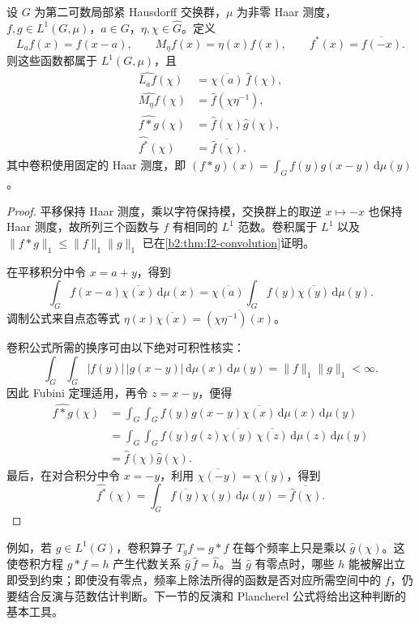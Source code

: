 \begin{proposition}[平移、调制、卷积与对合]
\label{b2:prop:I3-fourier-calculus}
设 \(G\) 为第二可数局部紧 Hausdorff 交换群，\(\mu\) 为非零 Haar 测度，\(f,g\in L^1(G,\mu)\)，\(a\in G\)，\(\eta,\chi\in\widehat G\)。定义
\[
 L_af(x)=f(x-a),\qquad M_\eta f(x)=\eta(x)f(x),\qquad
 f^*(x)=\overline{f(-x)}.
\]
则这些函数都属于 \(L^1(G,\mu)\)，且
\begin{align}
 \widehat{L_af}(\chi)&=\overline{\chi(a)}\,\widehat f(\chi),
    \label{b2:eq:I3-translation}\\
 \widehat{M_\eta f}(\chi)&=\widehat f(\chi\eta^{-1}),
    \label{b2:eq:I3-modulation}\\
 \widehat{f*g}(\chi)&=\widehat f(\chi)\widehat g(\chi),
    \label{b2:eq:I3-convolution}\\
 \widehat{f^*}(\chi)&=\overline{\widehat f(\chi)}.
    \label{b2:eq:I3-involution}
\end{align}
其中卷积使用固定的 Haar 测度，即
\((f*g)(x)=\int_G f(y)g(x-y)\,\mathrm d\mu(y)\)。
\end{proposition}
\begin{proof}
平移保持 Haar 测度，乘以字符保持模，交换群上的取逆 \(x\mapsto-x\) 也保持 Haar 测度，故所列三个函数与 \(f\) 有相同的 \(L^1\) 范数。卷积属于 \(L^1\) 以及 \(\|f*g\|_1\le\|f\|_1\|g\|_1\) 已在\cref{b2:thm:I2-convolution}证明。

在平移积分中令 \(x=a+y\)，得到
\[
 \int_G f(x-a)\overline{\chi(x)}\,\mathrm d\mu(x)
 =\overline{\chi(a)}\int_G f(y)\overline{\chi(y)}\,\mathrm d\mu(y).
\]
调制公式来自点态等式
\(\eta(x)\overline{\chi(x)}=\overline{(\chi\eta^{-1})(x)}\)。

卷积公式所需的换序可由以下绝对可积性核实：
\[
 \int_G\int_G|f(y)|\,|g(x-y)|\,\mathrm d\mu(x)\,\mathrm d\mu(y)
 =\|f\|_1\|g\|_1<\infty.
\]
因此 Fubini 定理适用，再令 \(z=x-y\)，便得
\begin{align*}
 \widehat{f*g}(\chi)
 &=\int_G\int_G f(y)g(x-y)\overline{\chi(x)}
       \,\mathrm d\mu(x)\,\mathrm d\mu(y)\\
 &=\int_G\int_G f(y)g(z)\overline{\chi(y)}\,
       \overline{\chi(z)}\,\mathrm d\mu(z)\,\mathrm d\mu(y)\\
 &=\widehat f(\chi)\widehat g(\chi).
\end{align*}
最后，在对合积分中令 \(x=-y\)，利用 \(\overline{\chi(-y)}=\chi(y)\)，得到
\[
 \widehat{f^*}(\chi)
 =\int_G\overline{f(y)}\chi(y)\,\mathrm d\mu(y)
 =\overline{\widehat f(\chi)}.
\]
\end{proof}

例如，若 \(g\in L^1(G)\)，卷积算子 \(T_gf=g*f\) 在每个频率上只是乘以 \(\widehat g(\chi)\)。这使卷积方程 \(g*f=h\) 产生代数关系
\(\widehat g\,\widehat f=\widehat h\)。当 \(\widehat g\) 有零点时，哪些 \(h\) 能被解出立即受到约束；即使没有零点，频率上除法所得的函数是否对应所需空间中的 \(f\)，仍要结合反演与范数估计判断。下一节的反演和 Plancherel 公式将给出这种判断的基本工具。
